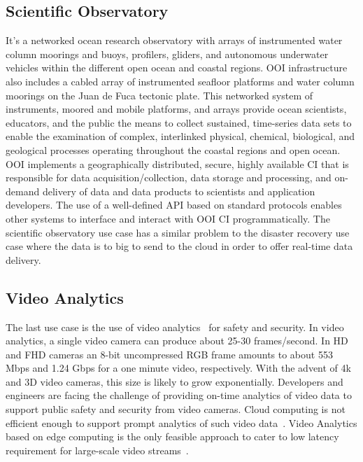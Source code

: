 \subsection{Scientific Observatory}

It's a networked ocean research observatory with arrays of instrumented water column moorings and buoys, profilers, gliders, and autonomous underwater vehicles within the different open ocean and coastal regions. OOI infrastructure also includes a cabled array of instrumented seafloor platforms and water column moorings on the Juan de Fuca tectonic plate. This networked system of instruments, moored and mobile platforms, and arrays provide ocean scientists, educators, and the public the means to collect sustained, time-series data sets to enable the examination of complex, interlinked physical, chemical, biological, and geological processes operating throughout the coastal regions and open ocean. OOI implements a geographically distributed, secure, highly available CI that is responsible for data acquisition/collection, data storage and processing, and on-demand delivery of data and data products to scientists and application developers. The use of a well-defined API based on standard protocols enables other systems to interface and interact with OOI CI programmatically. The scientific observatory use case has a similar problem to the disaster recovery use case where the data is to big to send to the cloud in order to offer real-time data delivery.

\subsection{Video Analytics} 

The last use case is the use of video analytics~\cite{8358733} for safety and security. In video analytics, a single video camera can produce about 25-30 frames/second. In HD and FHD cameras an 8-bit uncompressed RGB frame amounts to about 553 Mbps and 1.24 Gbps for a one minute video, respectively. With the advent of 4k and 3D video cameras, this size is likely to grow exponentially. Developers and engineers are facing the challenge of providing on-time analytics of video data to support public safety and security from video cameras. Cloud computing is not efficient enough to support prompt analytics of such video data~\cite{7488250}. Video Analytics based on edge computing is the only feasible approach to cater to low latency requirement for large-scale video streams~\cite{8057318}.

